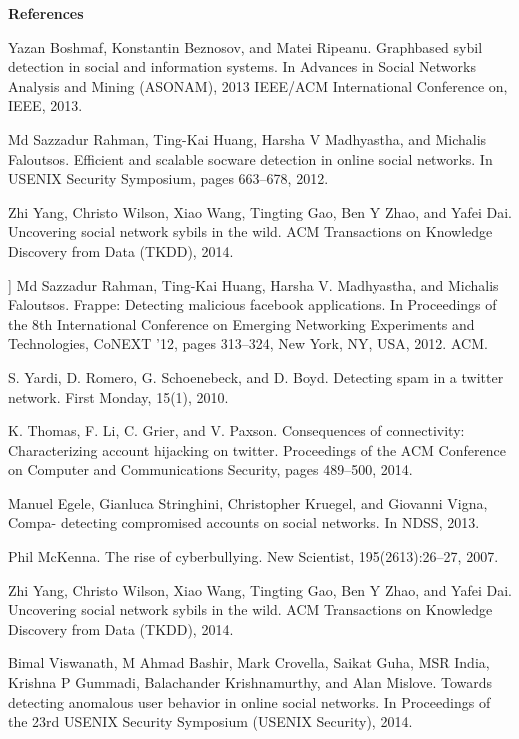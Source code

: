 \documentclass[conference]{IEEEtran}
\begin{document}
\begin{center}
\textbf{References}
\end{center}

\begin{enumerate}[label={[\arabic*]}]
 \item Yazan Boshmaf, Konstantin Beznosov, and Matei Ripeanu. Graphbased sybil detection in social and information systems. In Advances in Social Networks Analysis and Mining (ASONAM), 2013 IEEE/ACM International Conference on, IEEE, 2013. 
  \item  Md Sazzadur Rahman, Ting-Kai Huang, Harsha V Madhyastha, and Michalis Faloutsos. Efficient and scalable socware detection in online social networks. In USENIX Security Symposium, pages 663–678, 2012. 
  \item  Zhi Yang, Christo Wilson, Xiao Wang, Tingting
        Gao, Ben Y Zhao, and Yafei Dai. Uncovering social
        network sybils in the wild. ACM Transactions on
        Knowledge Discovery from Data (TKDD), 2014. 
 \item ] Md Sazzadur Rahman, Ting-Kai Huang, Harsha V. Madhyastha,
and Michalis Faloutsos. Frappe: Detecting malicious facebook
applications. In Proceedings of the 8th International Conference on
Emerging Networking Experiments and Technologies, CoNEXT ’12,
pages 313–324, New York, NY, USA, 2012. ACM.
\item S. Yardi, D. Romero, G. Schoenebeck, and D. Boyd.
Detecting spam in a twitter network. First Monday,
15(1), 2010.
\item K. Thomas, F. Li, C. Grier, and V. Paxson.
Consequences of connectivity: Characterizing
account hijacking on twitter. Proceedings of the
ACM Conference on Computer and
Communications Security, pages 489–500, 2014.
 \item Manuel Egele, Gianluca Stringhini, Christopher Kruegel, and Giovanni
Vigna, Compa- detecting compromised accounts on social
networks. In NDSS, 2013.
 \item Phil McKenna. The rise of cyberbullying. New
Scientist, 195(2613):26–27, 2007.
\item Zhi Yang, Christo Wilson, Xiao Wang, Tingting
Gao, Ben Y Zhao, and Yafei Dai. Uncovering social
network sybils in the wild. ACM Transactions on
Knowledge Discovery from Data (TKDD), 2014.
\item Bimal Viswanath, M Ahmad Bashir, Mark Crovella, Saikat Guha,
MSR India, Krishna P Gummadi, Balachander Krishnamurthy, and
Alan Mislove. Towards detecting anomalous user behavior in
online social networks. In Proceedings of the 23rd USENIX Security
Symposium (USENIX Security), 2014. 


\end{enumerate}
\end{document}
